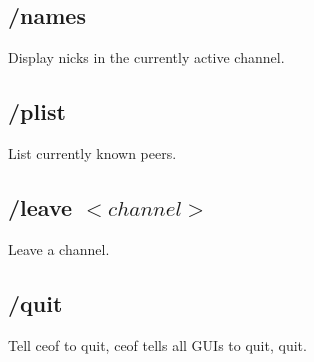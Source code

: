 \documentclass[12pt,a4paper]{article}
\begin{document}
\subsection{/names}
Display nicks in the currently active channel.

\subsection{/plist}
List currently known peers.

\subsection{/leave $<channel>$}
Leave a channel.

\subsection{/quit}
Tell ceof to quit, ceof tells all GUIs to quit, quit.
\end{document}
